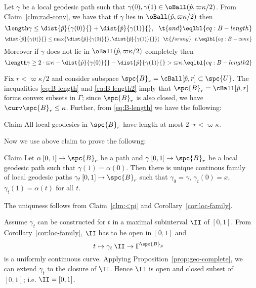 



Let $\gamma$ be a local geodesic path such that $\gamma(0),\gamma(1)\in \oBall(\hat p,\varpi\kappa/2)$.
From Claim~\ref{clm:rad-conv}, we have that 
if $\gamma$ lies in $\oBall(\hat p,\varpi\kappa/2)$  
then
$$\length\gamma\le \dist{\hat p}{\gamma(0)}{}+\dist{\hat p}{\gamma(1)}{},\ \ \t{and}
\eqlbl{eq:B-length}$$
$$\dist{\hat p}{\gamma(t)}{}\le\max\{\dist{\hat p}{\gamma(0)}{},\dist{\hat p}{\gamma(1)}{}\})
\ \ \t{for any}\ \ 
t.
\eqlbl{eq:B-conv}$$ 
Moreover if $\gamma$ does not lie in $\oBall(\hat p,\varpi\kappa/2)$ completely then
$$\length\gamma\ge2\cdot\varpi\kappa- \dist{\hat p}{\gamma(0)}{}-\dist{\hat p}{\gamma(1)}{}>\varpi\kappa.
\eqlbl{eq:B-length2}$$

Fix $r<\varpi\kappa/2$ and consider subspace $\spc{B}_r=\cBall[\hat p,r]\subset\spc{U}$.
The inequalities \ref{eq:B-length}  and \ref{eq:B-length2} imply that  $\spc{B}_r=\cBall[\hat p,r]$ forms convex subsets in $\Gamma$;
since $\spc{B}_r$ is also closed, we have $\curv\spc{B}_r\le\kappa$.
Further, from \ref{eq:B-length} we have the following:

\begin{clm}{Claim}\label{clm:<pi}
All local geodesics in $\spc{B}_r$ 
have length at most $2\cdot r<\varpi\kappa$.
\end{clm}

Now we use above claim to prove the followng:
 
\begin{clm}{Claim}\label{clm:homotopy}
Let  $\alpha\:[0,1]\to \spc{B}_r$ be a path
and $\gamma\:[0,1]\to \spc{B}_r$ be a local geodesic path 
such that $\gamma(1)=\alpha(0)$.
Then there is unique continous family of local geodesic paths $\gamma_t\:[0,1]\to \spc{B}_r$
such that $\gamma_0=\gamma$, $\gamma_t(0)=x$, $\gamma_t(1)=\alpha(t)$ for all $t$.
\end{clm}

The uniquness follows from  Claim~\ref{clm:<pi} and Corollary~\ref{cor:loc-family}.

Assume $\gamma_t$ can be constructed for $t$ in a maximal subinterval $\II$ of $[0,1]$.
From Corollary~\ref{cor:loc-family}, $\II$ has to be open in $[0,1]$
and 
$$t\mapsto\gamma_t\:\II\to\Gamma^{\spc{B}_{\hat p}}$$ 
is a uniformly continuous curve.
Applying  Proposition~\ref{prop:geo-complete}, we can extend $\gamma_t$ to the closure of $\II$.
Hence $\II$ is open and closed subset of $[0,1]$;
i.e. $\II=[0,1]$.
\qeds

